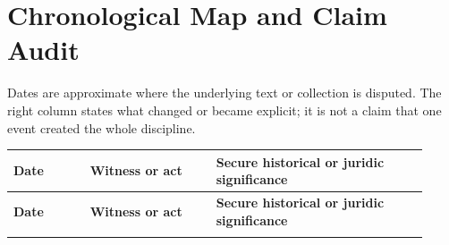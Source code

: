\section{Chronological Map and Claim Audit}

Dates are approximate where the underlying text or collection is disputed. The right column states what changed or became explicit; it is not a claim that one event created the whole discipline.

\begin{longtable}{>{\bfseries\RaggedRight\arraybackslash}p{0.17\linewidth}>{\RaggedRight\arraybackslash}p{0.28\linewidth}>{\RaggedRight\arraybackslash}p{0.47\linewidth}}
\toprule
\textbf{Date} & \textbf{Witness or act} & \textbf{Secure historical or juridic significance}\\
\midrule
\endfirsthead
\toprule
\textbf{Date} & \textbf{Witness or act} & \textbf{Secure historical or juridic significance}\\
\midrule
\endhead
\bottomrule
\endfoot


\end{longtable}
